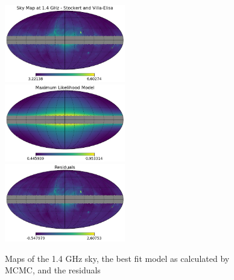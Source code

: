 \documentclass[%
onecolumn,
11pt,
tightenlines,
notitlepage,
superscriptaddress,
nofootinbib,
amsmath,amssymb,
aps,
pra,
]{revtex4-1}
\begin{document}
\begin{figure}[b]
\begin{center}
\includegraphics[width=0.47\textwidth]{1420_map.jpg}\\
\includegraphics[width=0.47\textwidth]{1420_model.jpg}\\
\includegraphics[width=0.47\textwidth]{1420_residuals.jpg}
\caption{Maps of the 1.4 GHz sky, the best fit model as calculated by MCMC, and the residuals}
\label{1420maps}
\end{center}
\end{figure}
\end{document}
